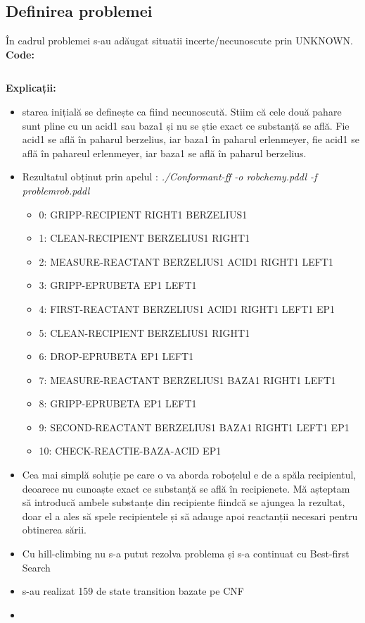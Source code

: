 \subsection{Definirea problemei}
În cadrul problemei s-au adăugat situatii incerte/necunoscute prin UNKNOWN.
\textbf{Code:}
\inputminted[linenos]{python}{code/Conformant/problemrob.pddl}
\textbf{Explicații:}
\begin{itemize}
    \setlength\itemsep{0em}
    \item starea inițială se definește ca fiind necunoscută. Stiim că cele două pahare sunt pline cu un acid1 sau baza1 și nu se știe exact ce substanță se află. Fie acid1 se află în paharul berzelius, iar baza1 în paharul erlenmeyer, fie acid1 se află în pahareul erlenmeyer, iar baza1 se află în paharul berzelius.
    \item Rezultatul obținut prin apelul : \textit{./Conformant-ff -o robchemy.pddl -f problemrob.pddl}\\
    \begin{itemize}
    \setlength\itemsep{0em}
        \item 0: GRIPP-RECIPIENT RIGHT1 BERZELIUS1 
        \item 1: CLEAN-RECIPIENT BERZELIUS1 RIGHT1
        \item 2: MEASURE-REACTANT BERZELIUS1 ACID1 RIGHT1 LEFT1 
        \item 3: GRIPP-EPRUBETA EP1 LEFT1
        \item 4: FIRST-REACTANT BERZELIUS1 ACID1 RIGHT1 LEFT1 EP1
        \item 5: CLEAN-RECIPIENT BERZELIUS1 RIGHT1
        \item 6: DROP-EPRUBETA EP1 LEFT1
        \item 7: MEASURE-REACTANT BERZELIUS1 BAZA1 RIGHT1 LEFT1
        \item 8: GRIPP-EPRUBETA EP1 LEFT1
        \item 9: SECOND-REACTANT BERZELIUS1 BAZA1 RIGHT1 LEFT1 EP1
        \item 10: CHECK-REACTIE-BAZA-ACID EP1
     \end{itemize}
     \item Cea mai simplă soluție pe care o va aborda roboțelul e de a spăla recipientul, deoarece nu cunoaște exact ce substanță se află în recipienete. Mă așteptam să introducă ambele substanțe din recipiente fiindcă se ajungea la rezultat, doar el a ales să spele recipientele și să adauge apoi reactanții necesari pentru obtinerea sării.
     \item Cu hill-climbing nu s-a putut rezolva problema și s-a continuat cu Best-first Search
     \item s-au realizat 159 de state transition bazate pe CNF
     \item 
     \end{itemize}
    

